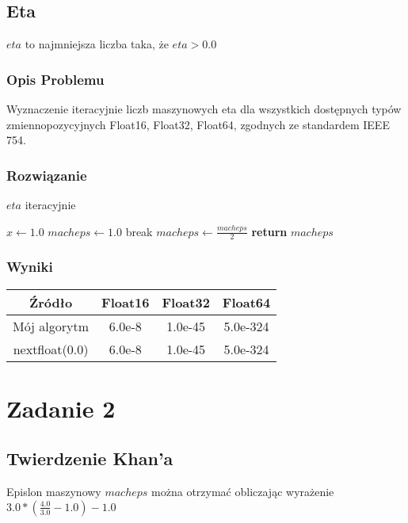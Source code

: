 \documentclass{article}
\begin{document}
\subsection{Eta}
	$eta$ to najmniejsza liczba taka, że $eta > 0.0$
\subsubsection{Opis Problemu}
    Wyznaczenie iteracyjnie liczb maszynowych eta dla wszystkich dostępnych typów zmiennopozycyjnych Float16, Float32, Float64, zgodnych ze standardem IEEE 754.
\subsubsection{Rozwiązanie}
    \begin{algorithm}
    \caption{$eta$ iteracyjnie}\label{alg:cap}
    \begin{algorithmic}
        \State $x \gets 1.0$
        \State $macheps \gets 1.0$
            	\State break
            \EndIf
            \State $macheps \gets \frac{macheps}{2}$
        \EndFor
        \State \textbf{return} $macheps$
    \end{algorithmic}
    \end{algorithm}

\subsubsection{Wyniki}
    \begin{center}
        \begin{tabular}{|c||c|c|c|}
        \hline
            Źródło & Float16 & Float32 & Float64 \\
            \hline\hline
            Mój algorytm & 6.0e-8 & 1.0e-45 & 5.0e-324\\
             \hline
             nextfloat(0.0) & 6.0e-8 & 1.0e-45 & 5.0e-324\\
        \hline
        \end{tabular}
    \end{center}

\section{Zadanie 2}
\subsection{Twierdzenie Khan'a}
	Epislon maszynowy $macheps$ można otrzymać obliczając wyrażenie $3.0*(\frac{4.0}{3.0} - 1.0) - 1.0$
\end{document}
